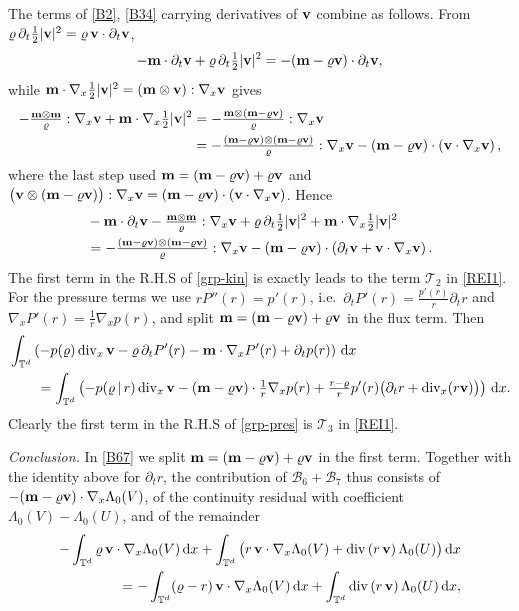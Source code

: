 \documentclass[12pt,a4paper,twoside]{article}
\newcommand{\Div}{\operatorname{div}}
\newcommand{\vr}{\varrho}
\newcommand{\vv}{\vc{v}}
\newcommand{\vc}[1]{{\bf #1}}
\newcommand{\dx}{{\,\rm d} {x}}
\newcommand{\lr}[1]{\left( #1 \right)}
\numberwithin{equation}{section}%
\newcommand{\vm}{\vc{m}}
\newcommand{\Gradx}{\nabla_x}
\newcommand{\Divx}{\operatorname{div}_x}
\newcommand{\Lambdaz}{\Lambda_0}
\begin{document}
\begin{pf}
	The terms of \eqref{B2}, \eqref{B34} carrying derivatives of $\vv$ combine as follows. From $\vr\,\partial_t\tfrac12|\vv|^2=\vr\,\vv\cdot\partial_t\vv$,
	\[
	-\vm\cdot\partial_t\vv+\vr\,\partial_t\tfrac12|\vv|^2=-(\vm-\vr\vv)\cdot\partial_t\vv ,
	\]
	while $\vm\cdot\Gradx\tfrac12|\vv|^2=(\vm\otimes\vv):\Gradx\vv$ gives
	\begin{align*}
		-\tfrac{\vm\otimes\vm}{\vr}:\Gradx\vv+\vm\cdot\Gradx\tfrac12|\vv|^2
		&=-\tfrac{\vm\otimes(\vm-\vr\vv)}{\vr}:\Gradx\vv\\
		&=-\tfrac{(\vm-\vr\vv)\otimes(\vm-\vr\vv)}{\vr}:\Gradx\vv-(\vm-\vr\vv)\cdot\lr{\vv\cdot\Gradx\vv},
	\end{align*}
	where the last step used $\vm=(\vm-\vr\vv)+\vr\vv$ and $\big(\vv\otimes(\vm-\vr\vv)\big):\Gradx\vv=(\vm-\vr\vv)\cdot(\vv\cdot\Gradx\vv)$. Hence
	\begin{equation}\label{grp-kin}
		\begin{aligned}
			&	-\vm\cdot\partial_t\vv-\tfrac{\vm\otimes\vm}{\vr}:\Gradx\vv
			+\vr\,\partial_t\tfrac12|\vv|^2+\vm\cdot\Gradx\tfrac12|\vv|^2 \\
			&	=-\tfrac{(\vm-\vr\vv)\otimes(\vm-\vr\vv)}{\vr}:\Gradx\vv
			-(\vm-\vr\vv)\cdot\lr{\partial_t\vv+\vv\cdot\Gradx\vv} .			
		\end{aligned}
	\end{equation}
	The first term in the R.H.S of \eqref{grp-kin} is exactly leads to the term $\mathcal{T}_2$ in \eqref{REI1}.
	For the pressure terms we use $rP''(r)=p'(r)$, i.e.\ $\partial_tP'(r)=\tfrac{p'(r)}{r}\partial_tr$ and $\Gradx P'(r)=\tfrac1r\Gradx p(r)$, and split $\vm=(\vm-\vr\vv)+\vr\vv$ in the flux term. Then
	\begin{equation}\label{grp-pres}
		\begin{aligned}
			&\int_{\mathbb T^d}\lr{-p(\vr)\Divx\vv-\vr\,\partial_tP'(r)-\vm\cdot\Gradx P'(r)+\partial_tp(r)}\dx\\
			&\qquad=\int_{\mathbb T^d}\lr{-p(\vr\,|\,r)\Divx\vv-(\vm-\vr\vv)\cdot\tfrac1r\Gradx p(r)
				+\tfrac{r-\vr}{r}p'(r)\big(\partial_tr+\Divx(r\vv)\big)}\dx .
		\end{aligned}
	\end{equation}
	Clearly the first term in the  R.H.S of \eqref{grp-pres} is $\mathcal{T}_3$ in \eqref{REI1}.

	
	\smallskip


	 \noindent\emph{Conclusion.} In \eqref{B67} we split $\vm=(\vm-\vr\vv)+\vr\vv$ in the first term. Together with the identity above for $\partial_t r$, the contribution of $\mathcal B_6+\mathcal B_7$ thus consists of $-(\vm-\vr\vv)\cdot\Gradx\Lambdaz(V)$, of the continuity residual with coefficient $\Lambdaz(V)-\Lambdaz(U)$, and of the remainder
	\begin{align*}
			 -\int_{\mathbb T^d}\vr\,\vv\cdot\Gradx\Lambdaz(V)\dx 
		 + \int_{\mathbb T^d}\big( r\,\vv\cdot \Gradx \Lambdaz(V)+ \Div \lr{ r\,\vv}\Lambdaz(U)\big) \dx\\
		=-\int_{\mathbb T^d}(\vr-r)\,\vv\cdot\Gradx\Lambdaz(V)\dx+\int_{\mathbb T^d} \Div\lr{r\,\vv} \Lambdaz(U)\dx ,
	\end{align*}
	

\end{pf}
\end{document}
